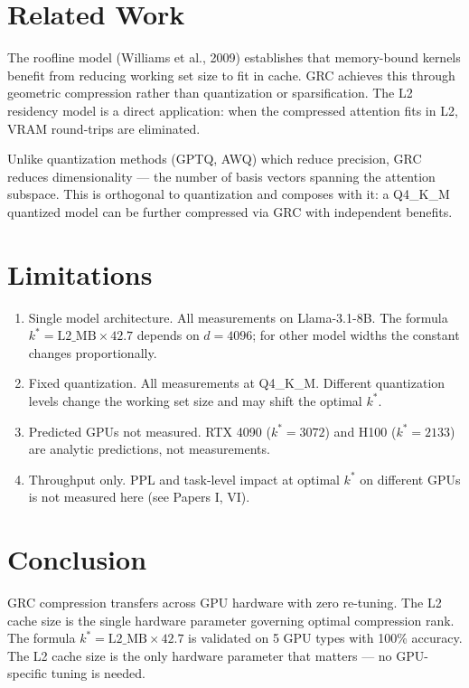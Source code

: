 \documentclass[11pt]{article}
\begin{document}
\section{Related Work}

The roofline model (Williams et al., 2009) establishes that memory-bound
kernels benefit from reducing working set size to fit in cache. GRC
achieves this through geometric compression rather than quantization or
sparsification. The L2 residency model is a direct application: when the
compressed attention fits in L2, VRAM round-trips are eliminated.

Unlike quantization methods (GPTQ, AWQ) which reduce precision,
GRC reduces dimensionality --- the number of basis vectors
spanning the attention subspace. This is orthogonal to quantization and
composes with it: a Q4\_K\_M quantized model can be further compressed
via GRC with independent benefits.

\section{Limitations}

\begin{enumerate}
\item Single model architecture. All measurements on
      Llama-3.1-8B. The formula $k^* = \mathrm{L2\_MB} \times 42.7$
      depends on $d{=}4096$; for other model widths the constant changes
      proportionally.
\item Fixed quantization. All measurements at Q4\_K\_M.
      Different quantization levels change the working set size and may
      shift the optimal $k^*$.
\item Predicted GPUs not measured. RTX 4090 ($k^*{=}3072$) and
      H100 ($k^*{=}2133$) are analytic predictions, not measurements.
\item Throughput only. PPL and task-level impact at optimal
      $k^*$ on different GPUs is not measured here (see Papers I, VI).
\end{enumerate}

\section{Conclusion}

GRC compression transfers across GPU hardware with zero re-tuning. The
L2 cache size is the single hardware parameter governing optimal
compression rank. The formula $k^* = \mathrm{L2\_MB} \times 42.7$ is
validated on 5 GPU types with 100\% accuracy. The L2 cache size is the only hardware parameter that matters --- no GPU-specific tuning is needed.
\end{document}
